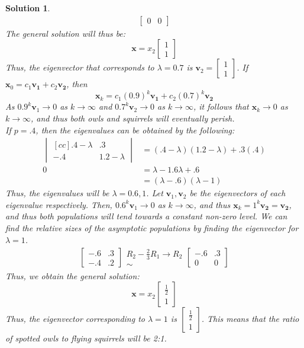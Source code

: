\documentclass[11pt]{scrartcl}
\theoremstyle{dotlessP}
\newtheorem{sol}{Solution}[section]
\theoremstyle{dotlessN}
\begin{document}
\begin{sol}
\begin{align*}
\begin{bmatrix}
		0 & 0 
	\end{bmatrix}	
\end{align*}
The general solution will thus be:
\[
	\bm{x} = x_2
	\begin{bmatrix}
		1 \\
		1
	\end{bmatrix}
\] 
Thus, the eigenvector that corresponds to $\lambda = 0.7$ is 
$\bm{v}_2 = 
\begin{bmatrix}
	1 \\
	1
\end{bmatrix}
$.
If $\bm{x}_0 = c_1 \bm{v_1} + c_2 \bm{v_2}$, then
\[
	\bm{x}_k = c_1(0.9)^k\bm{v_1} + c_2(0.7)^k\bm{v_2}
\] 
As $0.9^k\bm{v}_1 \to 0$ as $k \to \infty$ and $0.7^k\bm{v}_2 \to 0$ as $k \to \infty$, it follows that $\bm{x}_k \to 0$ as $k \to \infty$, and thus both owls and squirrels will eventually perish. 
\\

If $p = .4$, then the eigenvalues can be obtained by the following:
\begin{align*}
	\begin{vmatrix}[cc]
	.4 - \lambda & .3 \\
	-.4 & 1.2 - \lambda
\end{vmatrix} &= (.4 -\lambda)(1.2 - \lambda) + .3(.4) \\
	0 &= \lambda - 1.6\lambda + .6 \\
	  &= (\lambda - .6)(\lambda - 1)
\end{align*}
Thus, the eigenvalues will be $\lambda = 0.6, 1$. Let  $\bm{v}_1, \bm{v}_2$ be the eigenvectors of each eigenvalue respectively. Then, $0.6^k\bm{v}_1 \to 0$ as $k \to \infty$, and thus $\bm{x}_k = 1^k\bm{v_2} = \bm{v_2}$, and thus both populations will tend towards a constant non-zero level. We can find the relative sizes of the asymptotic populations by finding the eigenvector for $\lambda = 1$.
\begin{align*}
	\begin{bmatrix}
		-.6 & .3 \\
		-.4 & .2
	\end{bmatrix}
	\begin{array}{c}
	R_2 - \frac{2}{3}R_1 \to R_2 \\
	\sim
	\end{array}
	\begin{bmatrix}
		-.6 & .3 \\
		0 & 0
	\end{bmatrix}
\end{align*}
Thus, we obtain the general solution:
\[
	\bm{x} = x_2
	\begin{bmatrix}
		\frac{1}{2} \\
		1
	\end{bmatrix}
\] 
Thus, the eigenvector corresponding to $\lambda = 1$ is $
\begin{bmatrix}
	\frac{1}{2} \\
	1
\end{bmatrix}
$. This means that the ratio of spotted owls to flying squirrels will be 2:1.
\end{sol}
\end{document}
